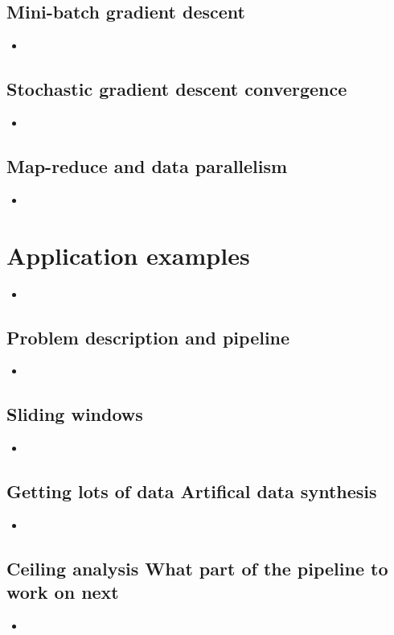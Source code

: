 \documentclass[13pt]{book}
\begin{document}
\section{Mini-batch gradient descent}
\begin{itemize}
  \item
\end{itemize}

\section{Stochastic gradient descent convergence}
\begin{itemize}
  \item
\end{itemize}

\section{Map-reduce and data parallelism}
\begin{itemize}
  \item
\end{itemize}

\chapter{Application examples}
\begin{itemize}
  \item
\end{itemize}

\section{Problem description and pipeline}
\begin{itemize}
  \item
\end{itemize}

\section{Sliding windows}
\begin{itemize}
  \item
\end{itemize}

\section{Getting lots of data Artifical data synthesis}
\begin{itemize}
  \item
\end{itemize}

\section{Ceiling analysis What part of the pipeline to work on next}
\begin{itemize}
  \item
\end{itemize}
\end{document}
